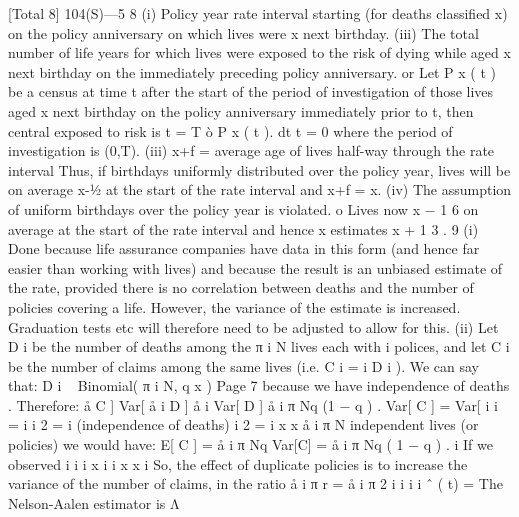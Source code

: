 [Total 8]
104(S)—5
8
(i) Policy year rate interval starting (for deaths classified x) on the policy
anniversary on which lives were x next birthday.
(iii) The total number of life years for which lives were exposed to the risk of
dying while aged x next birthday on the immediately preceding policy
anniversary.
or
Let P x ( t ) be a census at time t after the start of the period of investigation of those
lives aged x next birthday on the policy anniversary immediately prior to t, then
central exposed to risk is
t = T
ò P x ( t ). dt
t = 0
where the period of investigation is (0,T).
(iii) x+f = average age of lives half-way through the rate interval
Thus, if birthdays uniformly distributed over the policy year, lives will be
on average x-1⁄2 at the start of the rate interval and x+f = x.
(iv) The assumption of uniform birthdays over the policy year is violated.
o
Lives now x − 1 6 on average at the start of the rate interval and hence \mu x
estimates \mu x + 1 3 .
9
(i) Done because life assurance companies have data in this form (and hence
far easier than working with lives) and because the result is an unbiased
estimate of the rate, provided there is no correlation between deaths and
the number of policies covering a life. However, the variance of the
estimate is increased. Graduation tests etc will therefore need to be
adjusted to allow for this.
(ii) Let D i be the number of deaths among the π i N lives each with i polices,
and let C i be the number of claims among the same lives (i.e. C i = i D i ).
We can say that:
D i
~
Binomial( π i N, q x )
Page 7%
because we have independence of deaths . Therefore:
å C ]
Var[ å i D ]
å i Var[ D ]
å i π Nq (1 − q ) .
Var[ C ] =
Var[
i
i
=
i
i
2
=
i
(independence of deaths)
i
2
=
i
x
x
å i π N independent lives (or policies) we would have:
E[ C ] = å i π Nq
Var[C] = å i π Nq ( 1 − q ) .
i
If we observed
i
i
i
x
i
i
x
x
i
So, the effect of duplicate policies is to increase the variance of the number of
claims, in the ratio
å i π
r =
å i π
2
i
i
i
i
ˆ ( t) =
The Nelson-Aalen estimator is Λ
